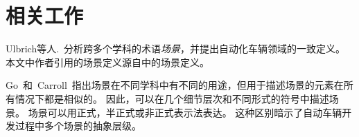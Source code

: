 \section{相关工作}
\label{related_work}
%
Ulbrich等人.~\cite{ulbrich_definition_2015}分析跨多个学科的术语\emph {场景}，并提出自动化车辆领域的一致定义。
本文中作者引用的场景定义源自\cite{ulbrich_definition_2015}中的场景定义。

Go~和~Carroll~\cite{go_blind_2004}指出场景在不同学科中有不同的用途，但用于描述场景的元素在所有情况下都是相似的。
因此，可以在几个细节层次和不同形式的符号中描述场景。
场景可以用正式，半正式或非正式表示法表达\cite{go_blind_2004}。
这种区别暗示了自动车辆开发过程中多个场景的抽象层级。

